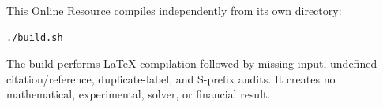 This Online Resource compiles independently from its own directory:
\begin{verbatim}
./build.sh
\end{verbatim}
The build performs LaTeX compilation followed by missing-input, undefined
citation/reference, duplicate-label, and S-prefix audits. It creates no
mathematical, experimental, solver, or financial result.
